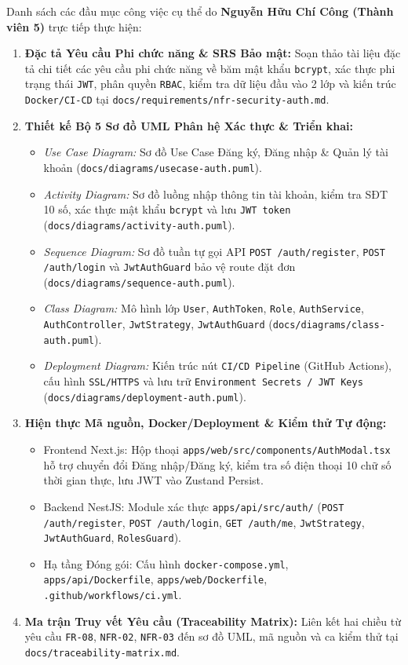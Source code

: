 \documentclass[a4paper]{article}
\begin{document}
Danh sách các đầu mục công việc cụ thể do \textbf{Nguyễn Hữu Chí Công (Thành viên 5)} trực tiếp thực hiện:
\begin{enumerate}
    \item \textbf{Đặc tả Yêu cầu Phi chức năng \& SRS Bảo mật:} Soạn thảo tài liệu đặc tả chi tiết các yêu cầu phi chức năng về băm mật khẩu \texttt{bcrypt}, xác thực phi trạng thái \texttt{JWT}, phân quyền \texttt{RBAC}, kiểm tra dữ liệu đầu vào 2 lớp và kiến trúc \texttt{Docker/CI-CD} tại \nolinkurl{docs/requirements/nfr-security-auth.md}.
    \item \textbf{Thiết kế Bộ 5 Sơ đồ UML Phân hệ Xác thực \& Triển khai:}
    \begin{itemize}
        \item \textit{Use Case Diagram:} Sơ đồ Use Case Đăng ký, Đăng nhập \& Quản lý tài khoản (\nolinkurl{docs/diagrams/usecase-auth.puml}).
        \item \textit{Activity Diagram:} Sơ đồ luồng nhập thông tin tài khoản, kiểm tra SĐT 10 số, xác thực mật khẩu \texttt{bcrypt} và lưu \texttt{JWT token} (\nolinkurl{docs/diagrams/activity-auth.puml}).
        \item \textit{Sequence Diagram:} Sơ đồ tuần tự gọi API \texttt{POST /auth/register}, \texttt{POST /auth/login} và \texttt{JwtAuthGuard} bảo vệ route đặt đơn (\nolinkurl{docs/diagrams/sequence-auth.puml}).
        \item \textit{Class Diagram:} Mô hình lớp \texttt{User}, \texttt{AuthToken}, \texttt{Role}, \texttt{AuthService}, \texttt{AuthController}, \texttt{JwtStrategy}, \texttt{JwtAuthGuard} (\nolinkurl{docs/diagrams/class-auth.puml}).
        \item \textit{Deployment Diagram:} Kiến trúc nút \texttt{CI/CD Pipeline} (GitHub Actions), cấu hình \texttt{SSL/HTTPS} và lưu trữ \texttt{Environment Secrets / JWT Keys} (\nolinkurl{docs/diagrams/deployment-auth.puml}).
    \end{itemize}
    \item \textbf{Hiện thực Mã nguồn, Docker/Deployment \& Kiểm thử Tự động:}
    \begin{itemize}
        \item Frontend Next.js: Hộp thoại \nolinkurl{apps/web/src/components/AuthModal.tsx} hỗ trợ chuyển đổi Đăng nhập/Đăng ký, kiểm tra số điện thoại 10 chữ số thời gian thực, lưu JWT vào Zustand Persist.
        \item Backend NestJS: Module xác thực \nolinkurl{apps/api/src/auth/} (\texttt{POST /auth/register}, \texttt{POST /auth/login}, \texttt{GET /auth/me}, \texttt{JwtStrategy}, \texttt{JwtAuthGuard}, \texttt{RolesGuard}).
        \item Hạ tầng Đóng gói: Cấu hình \nolinkurl{docker-compose.yml}, \nolinkurl{apps/api/Dockerfile}, \nolinkurl{apps/web/Dockerfile}, \nolinkurl{.github/workflows/ci.yml}.
    \end{itemize}
    \item \textbf{Ma trận Truy vết Yêu cầu (Traceability Matrix):} Liên kết hai chiều từ yêu cầu \texttt{FR-08}, \texttt{NFR-02}, \texttt{NFR-03} đến sơ đồ UML, mã nguồn và ca kiểm thử tại \nolinkurl{docs/traceability-matrix.md}.
\end{enumerate}
\end{document}
